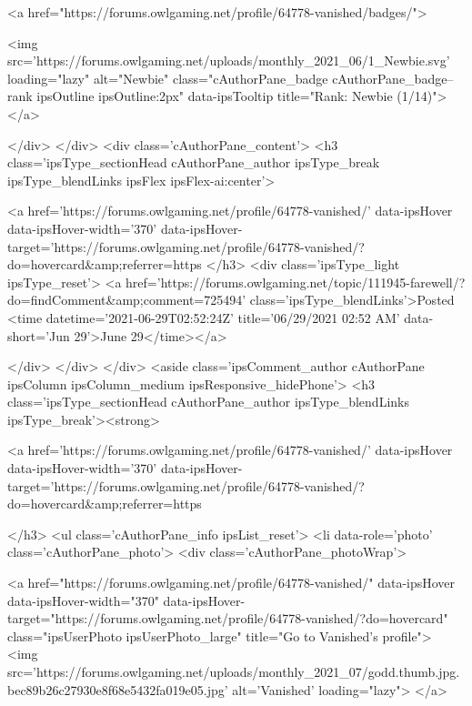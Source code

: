 				
				
					<a href="https://forums.owlgaming.net/profile/64778-vanished/badges/">
						
<img src='https://forums.owlgaming.net/uploads/monthly_2021_06/1_Newbie.svg' loading="lazy" alt="Newbie" class="cAuthorPane_badge cAuthorPane_badge--rank ipsOutline ipsOutline:2px" data-ipsTooltip title="Rank: Newbie (1/14)">
					</a>
				
			</div>
		</div>
		<div class='cAuthorPane_content'>
			<h3 class='ipsType_sectionHead cAuthorPane_author ipsType_break ipsType_blendLinks ipsFlex ipsFlex-ai:center'>
				


<a href='https://forums.owlgaming.net/profile/64778-vanished/' data-ipsHover data-ipsHover-width='370' data-ipsHover-target='https://forums.owlgaming.net/profile/64778-vanished/?do=hovercard&amp;referrer=https%
			</h3>
			<div class='ipsType_light ipsType_reset'>
				<a href='https://forums.owlgaming.net/topic/111945-farewell/?do=findComment&amp;comment=725494' class='ipsType_blendLinks'>Posted <time datetime='2021-06-29T02:52:24Z' title='06/29/2021 02:52  AM' data-short='Jun 29'>June 29</time></a>
				
			</div>
		</div>
	</div>
	<aside class='ipsComment_author cAuthorPane ipsColumn ipsColumn_medium ipsResponsive_hidePhone'>
		<h3 class='ipsType_sectionHead cAuthorPane_author ipsType_blendLinks ipsType_break'><strong>


<a href='https://forums.owlgaming.net/profile/64778-vanished/' data-ipsHover data-ipsHover-width='370' data-ipsHover-target='https://forums.owlgaming.net/profile/64778-vanished/?do=hovercard&amp;referrer=https%
			
		</h3>
		<ul class='cAuthorPane_info ipsList_reset'>
			<li data-role='photo' class='cAuthorPane_photo'>
				<div class='cAuthorPane_photoWrap'>
					


	<a href="https://forums.owlgaming.net/profile/64778-vanished/" data-ipsHover data-ipsHover-width="370" data-ipsHover-target="https://forums.owlgaming.net/profile/64778-vanished/?do=hovercard" class="ipsUserPhoto ipsUserPhoto_large" title="Go to Vanished's profile">
		<img src='https://forums.owlgaming.net/uploads/monthly_2021_07/godd.thumb.jpg.bec89b26c27930e8f68e5432fa019e05.jpg' alt='Vanished' loading="lazy">
	</a>

